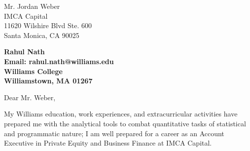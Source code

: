 \documentclass[11pt]{letter} %
\newcommand{\forceindent}{\leavevmode{\parindent=24pt\indent}}
\begin{document}

\begin{letter}{Mr. Jordan Weber \\
IMCA Capital \\
11620 Wilshire Blvd Ste. 600 \\
Santa Monica, CA 90025} 



\begin{center}
\large\bf Rahul Nath \\ %
Email: rahul.nath@williams.edu \\ Williams College \\ Williamstown, MA 01267
\end{center}


\opening{Dear Mr. Weber,}

\forceindent My Williams education, work experiences, and extracurricular activities have prepared me with the analytical tools to combat quantitative tasks of statistical and programmatic nature; I am well prepared for a career as an Account Executive in  Private Equity and Business Finance at IMCA Capital.


\end{letter}
\end{document}
